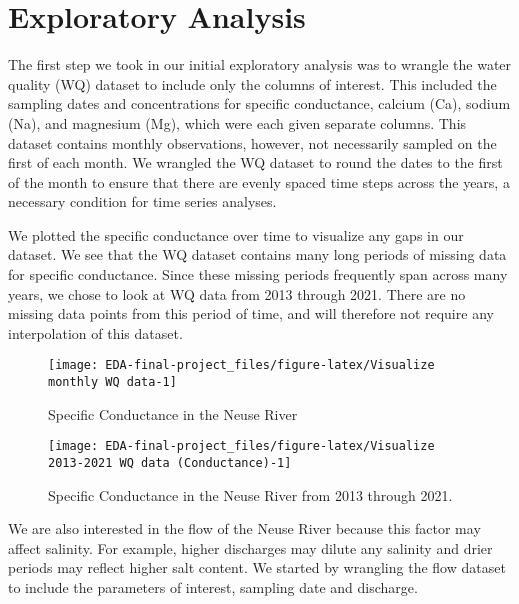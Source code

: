 \documentclass[
  12pt,
]{article}
\begin{document}
\newpage

\hypertarget{exploratory-analysis}{%
\section{Exploratory Analysis}\label{exploratory-analysis}}

The first step we took in our initial exploratory analysis was to
wrangle the water quality (WQ) dataset to include only the columns of
interest. This included the sampling dates and concentrations for
specific conductance, calcium (Ca), sodium (Na), and magnesium (Mg),
which were each given separate columns. This dataset contains monthly
observations, however, not necessarily sampled on the first of each
month. We wrangled the WQ dataset to round the dates to the first of the
month to ensure that there are evenly spaced time steps across the
years, a necessary condition for time series analyses.

We plotted the specific conductance over time to visualize any gaps in
our dataset. We see that the WQ dataset contains many long periods of
missing data for specific conductance. Since these missing periods
frequently span across many years, we chose to look at WQ data from 2013
through 2021. There are no missing data points from this period of time,
and will therefore not require any interpolation of this dataset.

\begin{figure}

\texttt{[image: EDA-final-project\_files/figure-latex/Visualize monthly WQ data-1]} \hfill{}

\caption{Specific Conductance in the Neuse River}\label{fig:Visualize monthly WQ data}
\end{figure}

\begin{figure}

\texttt{[image: EDA-final-project\_files/figure-latex/Visualize 2013-2021 WQ data (Conductance)-1]} \hfill{}

\caption{Specific Conductance in the Neuse River from 2013 through 2021.}\label{fig:Visualize 2013-2021 WQ data (Conductance)}
\end{figure}

We are also interested in the flow of the Neuse River because this
factor may affect salinity. For example, higher discharges may dilute
any salinity and drier periods may reflect higher salt content. We
started by wrangling the flow dataset to include the parameters of
interest, sampling date and discharge.
\end{document}
